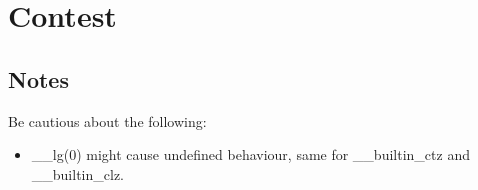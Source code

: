 \chapter{Contest}


\section{Notes}
Be cautious about the following:
\begin{itemize}
	\item \_\_lg(0) might cause undefined behaviour, same for \_\_builtin\_ctz and \_\_builtin\_clz.
\end{itemize}

